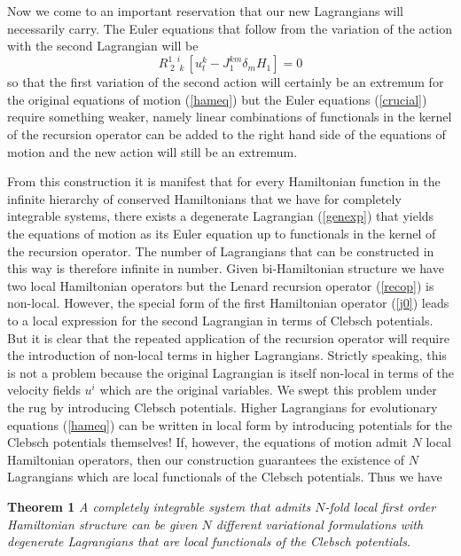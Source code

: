 \documentclass[a4paper,12pt]{article}
\begin{document}
Now we come to an important reservation that our new Lagrangians
will necessarily carry. The Euler equations that follow from the
variation of the action with the second Lagrangian will be
\begin{equation}
 R_{\;2 \; \;k}^{1 \;\; i} \,
  \left[ u^k_{t} - J^{km}_{1}  \delta_m H_1 \right]=0
 \label{crucial}
\end{equation}
so that the first variation of the second action will certainly be
an extremum for the original equations of motion (\ref{hameq}) but
the Euler equations (\ref{crucial}) require something weaker,
namely linear combinations of functionals in the kernel of the
recursion operator can be added to the right hand side of the
equations of motion and the new action will still be an extremum.

From this construction it is manifest that for every Hamiltonian
function in the infinite hierarchy of conserved Hamiltonians that
we have for completely integrable systems, there exists a
degenerate Lagrangian (\ref{genexp}) that yields the equations of
motion as its Euler equation up to functionals in the kernel of
the recursion operator. The number of Lagrangians that can be
constructed in this way is therefore infinite in number. Given
bi-Hamiltonian structure we have two local Hamiltonian operators
but the Lenard recursion operator (\ref{recop}) is non-local.
However, the special form of the first Hamiltonian operator
(\ref{j0}) leads to a local expression for the second Lagrangian
in terms of Clebsch potentials. But it is clear that the repeated
application of the recursion operator will require the
introduction of non-local terms in higher Lagrangians. Strictly
speaking, this is not a problem because the original Lagrangian is
itself non-local in terms of the velocity fields $u^i$ which are
the original variables. We swept this problem under the rug by
introducing Clebsch potentials. Higher Lagrangians for
evolutionary equations (\ref{hameq}) can be written in local form
by introducing potentials for the Clebsch potentials themselves!
If, however, the equations of motion admit $N$ local Hamiltonian
operators, then our construction guarantees the existence of $N$
Lagrangians which are local functionals of the Clebsch potentials.
Thus we have

{\bf Theorem 1} {\it A completely integrable system that admits
$N$-fold local first order Hamiltonian structure can be given $N$
different variational formulations with degenerate Lagrangians
that are local functionals of the Clebsch potentials}.
\end{document}

